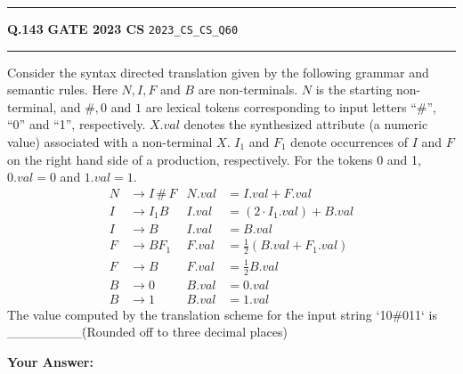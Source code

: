 \documentclass[a4paper,10pt]{article}
\begin{document}
\vspace{6pt}\hrule height 0.35pt\vspace{6pt}
\noindent
\begin{tcolorbox}[
    blanker,
    sidebyside,
    sidebyside align=top,
    lefthand width=0.55\textwidth,
    top=4pt, bottom=4pt, left=0pt, right=0pt,
    middle=16pt,
    underlay={
        \draw[dashed, black!80, line width=0.8pt, dash pattern=on 4pt off 3pt]
            ([xshift=0.55\textwidth+8pt]frame.north west) --
            ([xshift=0.55\textwidth+8pt]frame.south west);
    }
]
\textbf{Q.143}  \hfill {\footnotesize\textbf{GATE 2023 CS} \quad \tiny\texttt{2023\_CS\_CS\_Q60}}
\vspace{2pt}\hrule height 0.3pt\vspace{4pt}

Consider the syntax directed translation given by the following grammar and semantic rules. Here $N, I, F$ and $B$ are non-terminals. $N$ is the starting non-terminal, and $\#, 0$ and $1$ are lexical tokens corresponding to input letters ``\#'', ``0'' and ``1'', respectively. $X.val$ denotes the synthesized attribute (a numeric value) associated with a non-terminal $X$. $I_1$ and $F_1$ denote occurrences of $I$ and $F$ on the right hand side of a production, respectively. For the tokens 0 and 1, $0.val = 0$ and $1.val = 1$.
\begin{align*}
N &\to I \,\#\, F & N.val &= I.val + F.val \\
I &\to I_1 B & I.val &= (2 \cdot I_1.val) + B.val \\
I &\to B & I.val &= B.val \\
F &\to B F_1 & F.val &= \frac{1}{2}(B.val + F_1.val) \\
F &\to B & F.val &= \frac{1}{2}B.val \\
B &\to 0 & B.val &= 0.val \\
B &\to 1 & B.val &= 1.val
\end{align*}
The value computed by the translation scheme for the input string `10\#011` is \_\_\_\_\_\_\_\_\. (Rounded off to three decimal places)

\par\vspace{6pt}\noindent\textbf{Your Answer:} \fbox{\rule{0pt}{1.3ex}\hspace{3cm}}

\tcblower


\end{tcolorbox}
\end{document}
